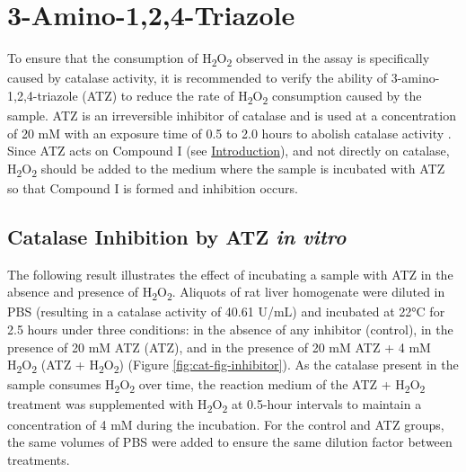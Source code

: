 \documentclass[
  9pt,
  american,
  a5paper,
  extrafontsizes,onecolumn,openright
  ]{memoir}
\begin{document}
\section{3-Amino-1,2,4-Triazole}\label{amino-124-triazole}

To ensure that the consumption of H\textsubscript{2}O\textsubscript{2} observed in the assay is specifically caused by catalase activity, it is recommended to verify the ability of 3-amino-1,2,4-triazole (ATZ) to reduce the rate of H\textsubscript{2}O\textsubscript{2} consumption caused by the sample. ATZ is an irreversible inhibitor of catalase and is used at a concentration of 20 mM with an exposure time of 0.5 to 2.0 hours to abolish catalase activity \autocite{margoliash_study_1958,margoliash_irreversible_1960,watanabe_autoxidation_2003}. Since ATZ acts on Compound I (see \hyperref[cat_intro]{Introduction}), and not directly on catalase, H\textsubscript{2}O\textsubscript{2} should be added to the medium where the sample is incubated with ATZ so that Compound I is formed and inhibition occurs.

\subsection{\texorpdfstring{Catalase Inhibition by ATZ \emph{in vitro}}{Catalase Inhibition by ATZ in vitro}}\label{catalase-inhibition-by-atz-in-vitro}

The following result illustrates the effect of incubating a sample with ATZ in the absence and presence of H\textsubscript{2}O\textsubscript{2}. Aliquots of rat liver homogenate were diluted in PBS (resulting in a catalase activity of 40.61 U/mL) and incubated at 22°C for 2.5 hours under three conditions: in the absence of any inhibitor (control), in the presence of 20 mM ATZ (ATZ), and in the presence of 20 mM ATZ + 4 mM H\textsubscript{2}O\textsubscript{2} (ATZ + H\textsubscript{2}O\textsubscript{2}) (Figure \ref{fig:cat-fig-inhibitor}). As the catalase present in the sample consumes H\textsubscript{2}O\textsubscript{2} over time, the reaction medium of the ATZ + H\textsubscript{2}O\textsubscript{2} treatment was supplemented with H\textsubscript{2}O\textsubscript{2} at 0.5-hour intervals to maintain a concentration of 4 mM during the incubation. For the control and ATZ groups, the same volumes of PBS were added to ensure the same dilution factor between treatments.



\scriptsize
\end{document}
